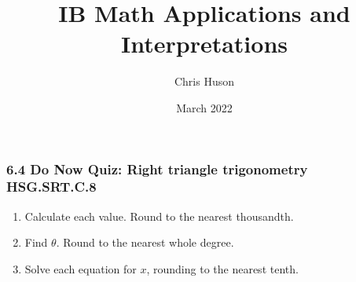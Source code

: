 \documentclass[12pt, twoside]{article}
\title{IB Math Applications and Interpretations}
\author{Chris Huson}
\date{March 2022}
\begin{document}
\subsubsection*{6.4 Do Now Quiz: Right triangle trigonometry \hfill HSG.SRT.C.8}
\begin{enumerate}
\item Calculate each value. Round to the nearest thousandth.
  \begin{enumerate}
  \end{enumerate}
  \vspace{1cm}

\item Find $\theta$. Round to the nearest whole degree.
  \begin{enumerate}
  \end{enumerate} \vspace{2cm}

\item Solve each equation for $x$, rounding to the nearest tenth.
  \begin{enumerate}
  \end{enumerate}
  \vspace{3cm}


\end{enumerate}
\end{document}
